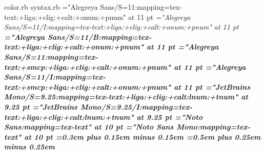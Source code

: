  color.rb
 syntax.rb
%
\def\ldfont     #1#2#3{"#1/S=#2:mapping=tex-text#3"          at #2 pt}%
\def\ldifont    #1#2#3{"#1/S=#2/I:mapping=tex-text#3"        at #2 pt}%
\def\ldbfont    #1#2#3{"#1/S=#2/B:mapping=tex-text#3"        at #2 pt}%
\def\ldbifont   #1#2#3{"#1/S=#2/BI:mapping=tex-text#3"       at #2 pt}%
\def\ldcapfont  #1#2#3{"#1/S=#2:mapping=tex-text:+smcp#3"    at #2 pt}%
\def\ldicapfont #1#2#3{"#1/S=#2/I:mapping=tex-text:+smcp#3"  at #2 pt}%
\def\ldbcapfont #1#2#3{"#1/S=#2/B:mapping=tex-text:+smcp#3"  at #2 pt}%
\def\ldbicapfont#1#2#3{"#1/S=#2/BI:mapping=tex-text:+smcp#3" at #2 pt}%
%
\def\basefamily{Alegreya Sans}%
\def\basesize{11}%
\def\basefeat{:+liga:+clig:+calt:+onum:+pnum}%
\font\rm  =\ldfont    {\basefamily}{\basesize}{\basefeat}%
\font\it  =\ldifont   {\basefamily}{\basesize}{\basefeat}%
\font\bf  =\ldbfont   {\basefamily}{\basesize}{\basefeat}%
\font\caps=\ldcapfont {\basefamily}{\basesize}{\basefeat}%
\font\icap=\ldicapfont{\basefamily}{\basesize}{\basefeat}%
%
\def\codefamily{JetBrains Mono}%
\def\codesize{9.25}%
\def\codefeat{:+liga:+clig:+calt:lnum:+tnum}%
%
\font\fw =\ldfont {\codefamily}{\codesize}{\codefeat}%
\font\ifw=\ldifont{\codefamily}{\codesize}{\codefeat}%
%
\def\fs{%
  \spaceskip=0.5em
  \xspaceskip=0.5em
}%
%
\font\noto    ="Noto Sans:mapping=tex-text"      at 10 pt
\font\notomono="Noto Sans Mono:mapping=tex-text" at 10 pt
%
\rm
\spaceskip =0.3em plus 0.15em minus 0.15em
\xspaceskip=0.5em plus 0.25em minus 0.25em
%
\def\lcap#1{%
  \font\localfont=\ldcapfont{\basefamily}{\basesize}{\basefeat:letterspace=#1}%
  \localfont
  \dimen0=0.0625\fontdimen2\localfont
  \multiply\dimen0 by #1
  \advance\dimen0 by \fontdimen2\localfont
  \spaceskip =   \dimen0 plus 0.5\dimen0 minus 0.5\dimen0
  \xspaceskip=1.5\dimen0 plus 0.5\dimen0 minus 0.5\dimen0
}%
\newbox\testbox
\newcount\testem
\newcount\testwd
\def\setrpcode#1#2{%
  \setbox\testbox=\hbox{\char#2}%
  \testwd=\wd\testbox
  \multiply\testwd by 1000
  \divide\testwd by\testem
  \rpcode#1 U#2 \the\testwd
}%
\def\setlpcode#1#2{%
  \setbox\testbox=\hbox{\char#2}%
  \testwd=\wd\testbox
  \multiply\testwd by 1000
  \divide\testwd by\testem
  \lpcode#1 U#2 \the\testwd
}%
\def\setpcodes#1{%
  {#1%
    \setbox\testbox=\hbox{\kern1em}%
    \testem=\wd\testbox
    \setrpcode{#1}{"0021}%
    \setlpcode{#1}{"0027}%
    \setlpcode{#1}{"0028}%
    \setrpcode{#1}{"0029}%
    \setrpcode{#1}{"002A}%
    \setrpcode{#1}{"002C}%
    \setrpcode{#1}{"002D}%
    \setrpcode{#1}{"002E}%
    \setrpcode{#1}{"003B}%
    \setrpcode{#1}{"003A}%
    \setrpcode{#1}{"003F}%
    \setlpcode{#1}{"005B}%
    \setrpcode{#1}{"005D}%
    \setlpcode{#1}{"2018}%
    \setrpcode{#1}{"2019}%
    \setlpcode{#1}{"201C}%
    \setrpcode{#1}{"201D}%
  }%
}%
